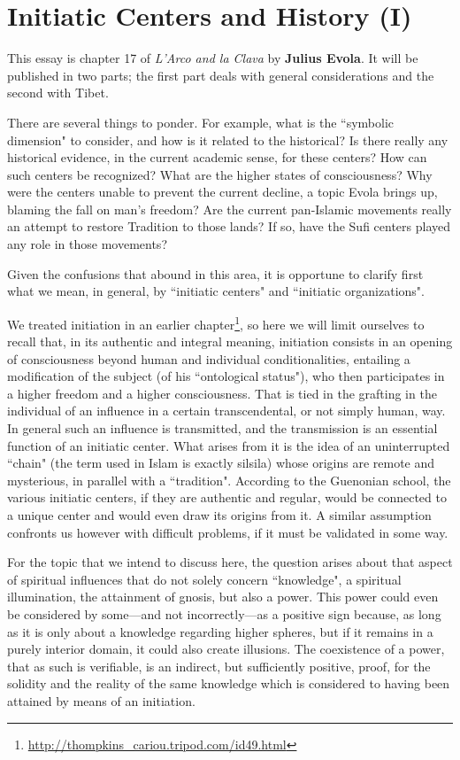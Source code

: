 \section{Initiatic Centers and History (I)}

\begin{quotex}
This essay is chapter 17 of \textit{L'Arco and la Clava} by \textbf{Julius Evola}. It will be published in two parts; the first part deals with general considerations and the second with Tibet.

There are several things to ponder. For example, what is the ``symbolic dimension" to consider, and how is it related to the historical? Is there really any historical evidence, in the current academic sense, for these centers? How can such centers be recognized? What are the higher states of consciousness? Why were the centers unable to prevent the current decline, a topic Evola brings up, blaming the fall on man's freedom? Are the current pan-Islamic movements really an attempt to restore Tradition to those lands? If so, have the Sufi centers played any role in those movements?

\end{quotex}
Given the confusions that abound in this area, it is opportune to clarify first what we mean, in general, by ``initiatic centers" and ``initiatic organizations".

We treated initiation in an earlier chapter\footnote{\url{http://thompkins_cariou.tripod.com/id49.html}}, so here we will limit ourselves to recall that, in its authentic and integral meaning, initiation consists in an opening of consciousness beyond human and individual conditionalities, entailing a modification of the subject (of his ``ontological status"), who then participates in a higher freedom and a higher consciousness. That is tied in the grafting in the individual of an influence in a certain transcendental, or not simply human, way. In general such an influence is transmitted, and the transmission is an essential function of an initiatic center. What arises from it is the idea of an uninterrupted ``chain" (the term used in Islam is exactly silsila) whose origins are remote and mysterious, in parallel with a ``tradition". According to the Guenonian school, the various initiatic centers, if they are authentic and regular, would be connected to a unique center and would even draw its origins from it. A similar assumption confronts us however with difficult problems, if it must be validated in some way.

For the topic that we intend to discuss here, the question arises about that aspect of spiritual influences that do not solely concern ``knowledge", a spiritual illumination, the attainment of gnosis, but also a power. This power could even be considered by some—and not incorrectly—as a positive sign because, as long as it is only about a knowledge regarding higher spheres, but if it remains in a purely interior domain, it could also create illusions. The coexistence of a power, that as such is verifiable, is an indirect, but sufficiently positive, proof, for the solidity and the reality of the same knowledge which is considered to having been attained by means of an initiation.

